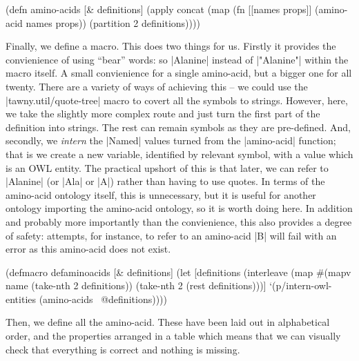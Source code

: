 \begin{tawny}
(defn amino-acids
  [& definitions]
  (apply
   concat
   (map
    (fn [[names props]] (amino-acid names props))
    (partition 2 definitions))))
\end{tawny}

Finally, we define a macro. This does two things for us. Firstly it
provides the convienience of using ``bear'' words: so |Alanine|
instead of |"Alanine"| within the macro itself. A small convienience
for a single amino-acid, but a bigger one for all twenty. There are a
variety of ways of achieving this -- we could use the
|tawny.util/quote-tree| macro to covert all the symbols to
strings. However, here, we take the slightly more complex route and
just turn the first part of the definition into strings. The rest can
remain symbols as they are pre-defined.  And, secondly, we
\emph{intern} the |Named| values turned from the |amino-acid|
function; that is we create a new variable, identified by relevant
symbol, with a value which is an OWL entity. The practical upshort of
this is that later, we can refer to |Alanine| (or |Ala| or |A|)
rather than having to use quotes. In terms of the amino-acid ontology
itself, this is unnecessary, but it is useful for another ontology
importing the amino-acid ontology, so it is worth doing here. In
addition and probably more importantly than the convienience, this
also provides a degree of safety: attempts, for instance, to refer to
an amino-acid |B| will fail with an error as this amino-acid does not
exist.

\begin{tawny}
(defmacro defaminoacids
  [& definitions]
  (let [definitions
        (interleave
         (map
          #(mapv name %
          (take-nth 2 definitions))
         (take-nth 2 (rest definitions)))]
    `(p/intern-owl-entities
      (amino-acids ~@definitions))))
\end{tawny}

Then, we define all the amino-acid. These have been laid out in
alphabetical order, and the properties arranged in a table which means that we
can visually check that everything is correct and nothing is missing.

